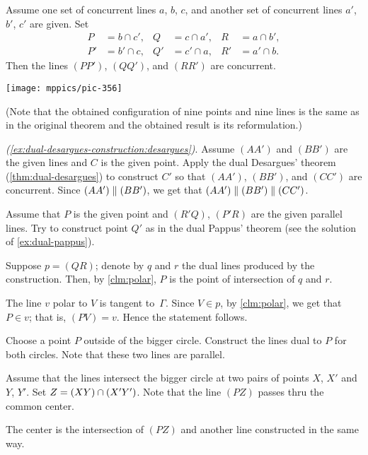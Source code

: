\begin{multicols}{2}
Assume one set of concurrent lines $a$, $b$, $c$, 
and another set of concurrent lines $a'$, $b'$, $c'$ are given.
Set 
\begin{align*}
P&=b\cap c',
&
Q&=c\cap a',
&
R&=a\cap b',\\
P'&=b'\cap c,
&
Q'&=c'\cap a,
&
R'&=a'\cap b.
\end{align*}
Then the lines $(PP')$, $(QQ')$, and $(RR')$ are concurrent.

\begin{Figure}
\vskip-0mm
\centering
\texttt{[image: mppics/pic-356]}
\vskip-0mm
\end{Figure}

(Note that the obtained configuration of nine points and nine lines is the same as in the original theorem and the obtained result is its reformulation.)

\parbf{\ref{ex:dual-desargues-construction},} \textit{(\ref{ex:dual-desargues-construction:desargues})}.
Assume $(AA')$ and $(BB')$ are the given lines and $C$ is the given point.
Apply the dual Desargues' theorem (\ref{thm:dual-desargues}) to construct $C'$ so that $(AA')$, $(BB')$, and $(CC')$ are concurrent. 
Since $(AA')\z\parallel (BB')$, 
we get that 
$(AA')\z\parallel (BB')\z\parallel (CC')$.

 Assume that $P$ is the given point and $(R'Q)$, $(P'R)$ are the given parallel lines.
Try to construct point $Q'$ as in the dual Pappus' theorem (see the solution of \ref{ex:dual-pappus}).

 Suppose $p=(QR)$; denote by $q$ and $r$ the dual lines produced by the construction.
Then, by \ref{clm:polar}, $P$ is the point of intersection of $q$ and $r$.

The line $v$ polar to $V$ is tangent to~$\Gamma$.
Since $V\in p$, by \ref{clm:polar}, we get that $P\in v$;
that is, $(PV)=v$.
Hence the statement follows.



Choose a point $P$ outside of the bigger circle.
Construct the lines dual to $P$ for both circles.
Note that these two lines are parallel. 

Assume that the lines intersect the bigger circle at two pairs of points $X$, $X'$ and $Y$, $Y'$.
Set $Z\z=(XY)\cap (X'Y')$.
Note that the line $(PZ)$ passes thru the common center.

The center is the intersection of $(PZ)$ and another line constructed in the same way.


\end{multicols}
